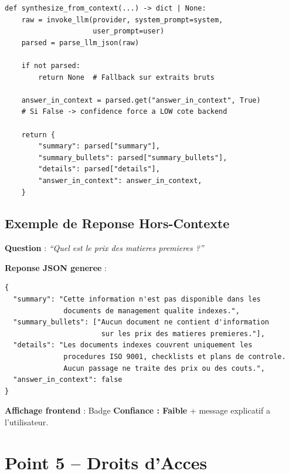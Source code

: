 \documentclass[12pt,a4paper]{article}
\begin{document}
\begin{lstlisting}[style=pythonstyle, caption={Parsing et validation de la reponse LLM}]
def synthesize_from_context(...) -> dict | None:
    raw = invoke_llm(provider, system_prompt=system,
                     user_prompt=user)
    parsed = parse_llm_json(raw)

    if not parsed:
        return None  # Fallback sur extraits bruts

    answer_in_context = parsed.get("answer_in_context", True)
    # Si False -> confidence force a LOW cote backend

    return {
        "summary": parsed["summary"],
        "summary_bullets": parsed["summary_bullets"],
        "details": parsed["details"],
        "answer_in_context": answer_in_context,
    }
\end{lstlisting}

\subsection{Exemple de Reponse Hors-Contexte}

\begin{infobox}
\textbf{Question} : \textit{``Quel est le prix des matieres premieres ?''}

\medskip
\textbf{Reponse JSON generee} :
\begin{verbatim}
{
  "summary": "Cette information n'est pas disponible dans les
              documents de management qualite indexes.",
  "summary_bullets": ["Aucun document ne contient d'information
                       sur les prix des matieres premieres."],
  "details": "Les documents indexes couvrent uniquement les
              procedures ISO 9001, checklists et plans de controle.
              Aucun passage ne traite des prix ou des couts.",
  "answer_in_context": false
}
\end{verbatim}

\textbf{Affichage frontend} : Badge \textcolor{danger}{\textbf{Confiance : Faible}} +
message explicatif a l'utilisateur.
\end{infobox}

\section{Point 5 -- Droits d'Acces}
\end{document}

